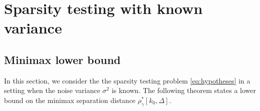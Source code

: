 \documentclass[twoside,11pt]{article}
\def\beq{\begin{equation}}
\def\eeq{\end{equation}}
\def\bbB{\mathbb{B}}
\renewcommand{\P}{\operatorname{\mathbb{P}}}
\newcommand{\<}{\langle}
\renewcommand{\>}{\rangle}
\begin{document}
\section{Sparsity testing with known variance}\label{sec:testKV}


\begin{comment}
\subsection{Objective}





In this section , we consider the problem of testing the sparsity of $\theta$ when $\sigma$ is known. More precisely, given two integers $k_1>k_0$, we characterize the minimal $\rho>0$ to distinguish the two following hypotheses:
\beq\label{eq:hypotheses}
 H_{k_0}: \ \theta\in \bbB_0[k_0]\quad \text{ versus }\quad  H_{\Delta,k_0,\rho}:\ \theta \in \bbB_0[k_0+\Delta,k_0,\rho]\ .
\eeq
We emphasize that $\theta$ in $\bbB_0[k_0+\Delta,k_0,\rho]$ is at distance larger or equal to $\rho$ from the collection $\bbB_0[k_0]$ of $k_0$-sparse vectors. 
In the sequel, we denote $\Delta$ the sparsity difference and $k_1=k_0+\Delta$. 
 Fix some $\gamma\in (0,1)$. Given a test $T$, let us define its risk $R(T,\rho)$ for the problem \eqref{eq:hypotheses} by
\beq\label{eq:risk}
R(T;k_0,\Delta,\rho):= \sup_{\theta \in \bbB_0[k_0]}\P_{\theta}[T=1] +  \sup_{\theta \in \bbB_0[k_0+\Delta,k_0,\rho]}\P_{\theta}[T=0]
\eeq
and its separation distance $\rho_\gamma(T;k_0,\Delta)$ by
\beq\label{eq:separation}
\rho_{\gamma}(T;k_0,\Delta):= \sup \left\{\rho>0\ |R(T;k_0,\Delta,\rho)>\gamma\right\}
\eeq
Finally, the minimax separation distance $\rho^*_{\gamma}[k_0,\Delta]:= \inf_{T}\rho_{\gamma}(T;k_0,\Delta)$. This separation distance characterizes the smallest
 distance between the hypotheses such that a uniformly consistent test for the Testing Problem~\eqref{eq:hypotheses} exists.


\end{comment}

\subsection{Minimax lower bound}\label{sec:lbkv}


In this section, we consider the  the sparsity testing problem \eqref{eq:hypotheses}  in a setting when the noise variance $\sigma^2$ is known. 
The following theorem states a lower bound on the minimax separation distance $\rho^*_{\gamma}[k_0,\Delta]$.
\end{document}
